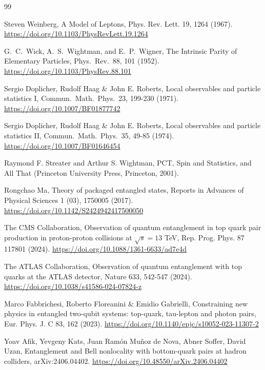 \documentclass[12pt,a4paper]{article}
\begin{document}
\begin{thebibliography}{99}
	
	Steven Weinberg, 
	A Model of Leptons, 
	Phys. Rev. Lett. 19, 1264 (1967).
	\url{https://doi.org/10.1103/PhysRevLett.19.1264}
	
	
	
	G.~C.\ Wick, A.~S.\ Wightman, and E.~P.\ Wigner,
	The Intrinsic Parity of Elementary Particles,
	Phys.\ Rev.\ 88, 101 (1952).
	\url{https://doi.org/10.1103/PhysRev.88.101}  
	
	
	Sergio Doplicher, Rudolf Haag \& John E. Roberts,
	Local observables and particle statistics I,
	Commun.\ Math.\ Phys.\ 23, 199-230 (1971).
	\url{https://doi.org/10.1007/BF01877742}
	
	
	Sergio Doplicher, Rudolf Haag \& John E. Roberts,
	Local observables and particle statistics II,
	Commun.\ Math.\ Phys.\ 35, 49-85 (1974).
	\url{https://doi.org/10.1007/BF01646454}
	
	
	Raymond F. Streater and Arthur S. Wightman,
	PCT, Spin and Statistics, and All That
	(Princeton University Press, Princeton, 2001).
	
	
	Rongchao Ma, 
	Theory of packaged entangled states, 
	Reports in Advances of Physical Sciences 1 (03), 1750005 (2017).
	\url{https://doi.org/10.1142/S2424942417500050}
	
	
	The CMS Collaboration,
	Observation of quantum entanglement in top quark pair production in proton-proton collisions at $\sqrt{s} = 13$ TeV,
	Rep. Prog. Phys. 87 117801 (2024).
	\url{https://doi.org/10.1088/1361-6633/ad7e4d}
	
	
	The ATLAS Collaboration,
	Observation of quantum entanglement with top quarks at the ATLAS detector,
	Nature 633, 542-547 (2024).
	\url{https://doi.org/10.1038/s41586-024-07824-z}
	
	
	Marco Fabbrichesi, Roberto Floreanini \& Emidio Gabrielli,
	Constraining new physics in entangled two-qubit systems: top-quark, tau-lepton and photon pairs,
	Eur. Phys. J. C 83, 162 (2023).
	\url{https://doi.org/10.1140/epjc/s10052-023-11307-2}
	
	
	Yoav Afik, Yevgeny Kats, Juan Ramón Muñoz de Nova, Abner Soffer, David Uzan,
	Entanglement and Bell nonlocality with bottom-quark pairs at hadron colliders,
	arXiv:2406.04402.
	\url{https://doi.org/10.48550/arXiv.2406.04402}
	

\end{thebibliography}
\end{document}
